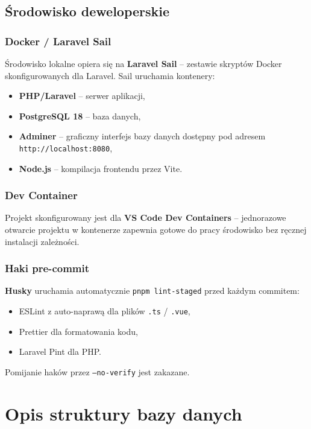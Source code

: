 \documentclass[12pt,a4paper]{report}
\begin{document}
\section{Środowisko deweloperskie}

\subsection{Docker / Laravel Sail}

Środowisko lokalne opiera się na \textbf{Laravel Sail} -- zestawie skryptów Docker skonfigurowanych dla Laravel. Sail uruchamia kontenery:
\begin{itemize}[noitemsep]
    \item \textbf{PHP/Laravel} -- serwer aplikacji,
    \item \textbf{PostgreSQL 18} -- baza danych,
    \item \textbf{Adminer} -- graficzny interfejs bazy danych dostępny pod adresem \texttt{http://localhost:8080},
    \item \textbf{Node.js} -- kompilacja frontendu przez Vite.
\end{itemize}

\subsection{Dev Container}

Projekt skonfigurowany jest dla \textbf{VS Code Dev Containers} -- jednorazowe otwarcie projektu w kontenerze zapewnia gotowe do pracy środowisko bez ręcznej instalacji zależności.

\subsection{Haki pre-commit}

\textbf{Husky} uruchamia automatycznie \texttt{pnpm lint-staged} przed każdym commitem:
\begin{itemize}[noitemsep]
    \item ESLint z auto-naprawą dla plików \texttt{.ts} / \texttt{.vue},
    \item Prettier dla formatowania kodu,
    \item Laravel Pint dla PHP.
\end{itemize}
Pomijanie haków przez \texttt{--no-verify} jest zakazane.


\chapter{Opis struktury bazy danych}
\label{ch:baza}
\end{document}
